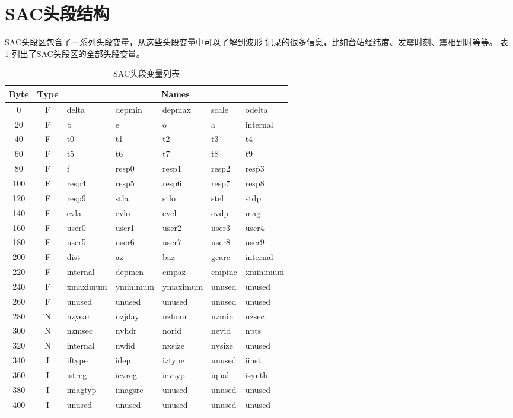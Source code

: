 \section{SAC头段结构}
SAC头段区包含了一系列头段变量，从这些头段变量中可以了解到波形
记录的很多信息，比如台站经纬度、发震时刻、震相到时等等。
表 \ref{table:header-variables} 列出了SAC头段区的全部头段变量。

\begin{table}[H]
\ttfamily
\small
\centering
\caption{SAC头段变量列表}
\label{table:header-variables}
\begin{tabular}{c|c|lllll}
	\toprule
    Byte	&	Type	&	\multicolumn{5}{c}{Names}\\
	\midrule
	0		&	F	&	delta	&	depmin	&	depmax	&	scale	&	odelta	\\
	20		&	F	&	b		&	e		&	o		&	a		&	internal\\
	40		&	F	&	t0		&	t1		&	t2		&	t3		&	t4		\\
	60		&	F	&	t5		&	t6		&	t7		&	t8		&	t9		\\
	80		&	F	&	f		&	resp0	&	resp1	&	resp2	&	resp3	\\
	100		&	F	&	resp4	&	resp5	&	resp6	&	resp7	&	resp8	\\
    120		&	F	&	resp9	&	stla	&	stlo	&	stel	&	stdp	\\
	140		&	F	&	evla	&	evlo	&	evel	&	evdp	&	mag		\\
	160		&	F	&	user0	&	user1	&	user2	&	user3	&	user4	\\
	180		&	F	&	user5	&	user6	&	user7	&	user8	&	user9	\\
	200		&	F	&	dist	&	az		&	baz		&	gcarc	&	internal\\
	220		&	F	&	internal&	depmen	&	cmpaz	&	cmpinc	&	xminimum\\
	240		&	F	&	xmaximum&	yminimum&	ymaximum&	unused	&	unused	\\
	260		&	F	&	unused	&	unused	&	unused	&	unused	&	unused	\\
	280		&	N	&	nzyear	&	nzjday	&	nzhour	&	nzmin	&	nzsec	\\
	300		&	N	&	nzmsec	&	nvhdr	&	norid	&	nevid	&	npts	\\
	320		&	N	&	internal&	nwfid	&	nxsize	&	nysize	&	unused	\\
	340		&	I	&	iftype	&	idep	&	iztype	&	unused	&	iinst	\\
	360		&	I	&	istreg	&	ievreg	&	ievtyp	&	iqual	&	isynth	\\
    380		&	I	&	imagtyp &	imagsrc	&	unused	&	unused	&	unused	\\
	400		&	I	&	unused	&	unused	&	unused	&	unused	&	unused	\\

\end{tabular}
\end{table}
